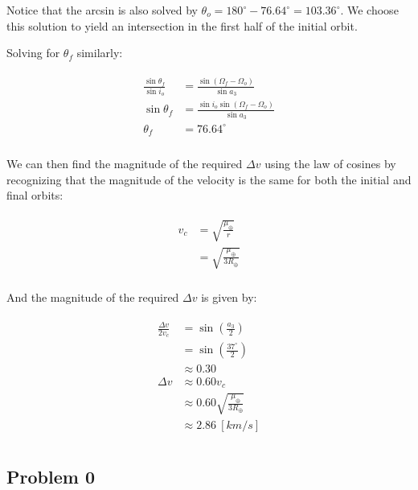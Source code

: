 \documentclass[
]{article}
\begin{document}
Notice that the arcsin is also solved by
\(\theta_o = 180^\circ - 76.64^\circ = 103.36^\circ\). We choose this
solution to yield an intersection in the first half of the initial
orbit.

Solving for \(\theta_f\) similarly:

\[\begin{aligned}
\begin{aligned}
    \frac{\sin\theta_f}{\sin i_o} &= \frac{\sin(\Omega_f - \Omega_o)}{\sin a_3} \\
    \sin\theta_f &= \frac{\sin i_o \sin(\Omega_f - \Omega_o)}{\sin a_3} \\
    \theta_f &= 76.64^\circ \\
\end{aligned}
\end{aligned}\]

We can then find the magnitude of the required \(\Delta v\) using the
law of cosines by recognizing that the magnitude of the velocity is the
same for both the initial and final orbits:

\[\begin{aligned}
\begin{aligned}
    v_c &= \sqrt{\frac{\mu_\oplus}{r}} \\
    &= \sqrt{\frac{\mu_\oplus}{3R_\oplus}} \\
\end{aligned}
\end{aligned}\]

And the magnitude of the required \(\Delta v\) is given by:

\[\begin{aligned}
\begin{aligned}
    \frac{\Delta v}{2 v_c} &= \sin\left( \frac{a_3}{2} \right) \\
    &= \sin\left( \frac{37^\circ}{2} \right) \\
    &\approx 0.30 \\
    \Delta v &\approx 0.60 v_c \\
    &\approx 0.60 \sqrt{\frac{\mu_\oplus}{3R_\oplus}} \\
    &\approx 2.86 \: [km/s] \\
\end{aligned}
\end{aligned}\]

\subsection{Problem 0}\label{problem-0}
\end{document}
